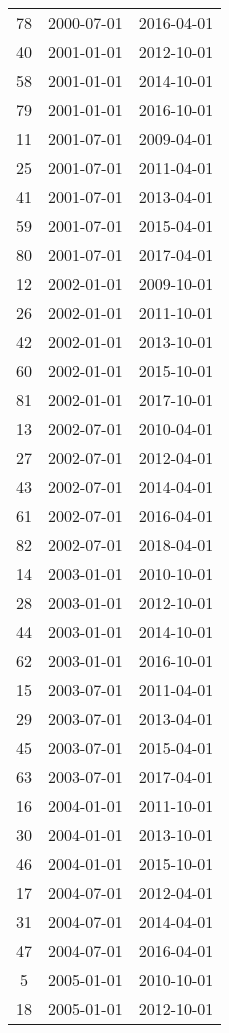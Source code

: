 \begin{tabular}{ccc}
  78 & 2000-07-01 & 2016-04-01 \\ 
  40 & 2001-01-01 & 2012-10-01 \\ 
  58 & 2001-01-01 & 2014-10-01 \\ 
  79 & 2001-01-01 & 2016-10-01 \\ 
  11 & 2001-07-01 & 2009-04-01 \\ 
  25 & 2001-07-01 & 2011-04-01 \\ 
  41 & 2001-07-01 & 2013-04-01 \\ 
  59 & 2001-07-01 & 2015-04-01 \\ 
  80 & 2001-07-01 & 2017-04-01 \\ 
  12 & 2002-01-01 & 2009-10-01 \\ 
  26 & 2002-01-01 & 2011-10-01 \\ 
  42 & 2002-01-01 & 2013-10-01 \\ 
  60 & 2002-01-01 & 2015-10-01 \\ 
  81 & 2002-01-01 & 2017-10-01 \\ 
  13 & 2002-07-01 & 2010-04-01 \\ 
  27 & 2002-07-01 & 2012-04-01 \\ 
  43 & 2002-07-01 & 2014-04-01 \\ 
  61 & 2002-07-01 & 2016-04-01 \\ 
  82 & 2002-07-01 & 2018-04-01 \\ 
  14 & 2003-01-01 & 2010-10-01 \\ 
  28 & 2003-01-01 & 2012-10-01 \\ 
  44 & 2003-01-01 & 2014-10-01 \\ 
  62 & 2003-01-01 & 2016-10-01 \\ 
  15 & 2003-07-01 & 2011-04-01 \\ 
  29 & 2003-07-01 & 2013-04-01 \\ 
  45 & 2003-07-01 & 2015-04-01 \\ 
  63 & 2003-07-01 & 2017-04-01 \\ 
  16 & 2004-01-01 & 2011-10-01 \\ 
  30 & 2004-01-01 & 2013-10-01 \\ 
  46 & 2004-01-01 & 2015-10-01 \\ 
  17 & 2004-07-01 & 2012-04-01 \\ 
  31 & 2004-07-01 & 2014-04-01 \\ 
  47 & 2004-07-01 & 2016-04-01 \\ 
  5 & 2005-01-01 & 2010-10-01 \\ 
  18 & 2005-01-01 & 2012-10-01 \\ 

\end{tabular}
